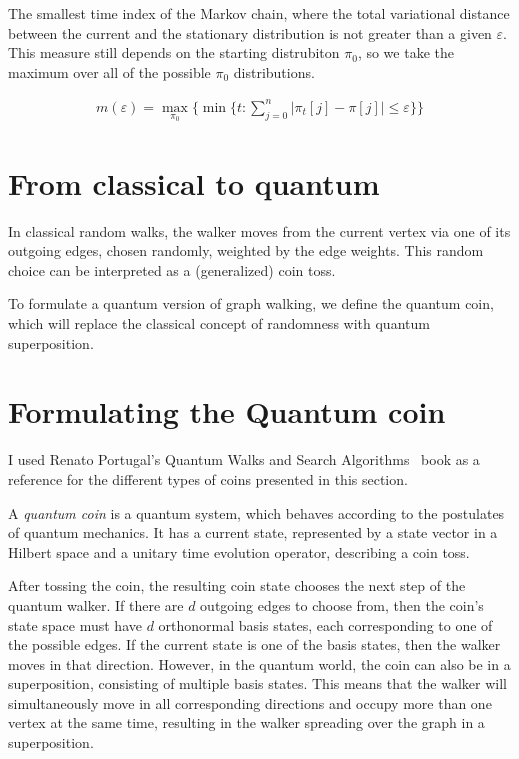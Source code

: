 \begin{definition} The smallest time index of the Markov chain, where the total variational distance between the current and the stationary distribution is not greater than a given $\varepsilon$. This measure still depends on the starting distrubiton $\pi_0$, so we take the maximum over all of the possible $\pi_0$ distributions.

\begin{align*}
m(\varepsilon) = \max\limits_{\pi_0}\{\min\{t : \sum\limits_{j=0}^{n}|\pi_t[j] - \pi[j]| \leq \varepsilon\}\}
\end{align*}

\end{definition}

\section{From classical to quantum}

In classical random walks, the walker moves from the current vertex via one of its outgoing edges, chosen randomly, weighted by the edge weights. This random choice can be interpreted as a (generalized) coin toss.

To formulate a quantum version of graph walking, we define the quantum coin, which will replace the classical concept of randomness with quantum superposition.

\section{Formulating the Quantum coin}

I used Renato Portugal's Quantum Walks and Search Algorithms~\cite{Portugal} book as a reference for the different types of coins presented in this section.

A \textit{quantum coin} is a quantum system, which behaves according to the postulates of quantum mechanics. It has a current state, represented by a state vector in a Hilbert space and a unitary time evolution operator, describing a coin toss.

After tossing the coin, the resulting coin state chooses the next step of the quantum walker. If there are $d$ outgoing edges to choose from, then the coin's state space must have $d$ orthonormal basis states, each corresponding to one of the possible edges. If the current state is one of the basis states, then the walker moves in that direction. However, in the quantum world, the coin can also be in a superposition, consisting of multiple basis states. This means that the walker will simultaneously move in all corresponding directions and occupy more than one vertex at the same time, resulting in the walker spreading over the graph in a superposition.

